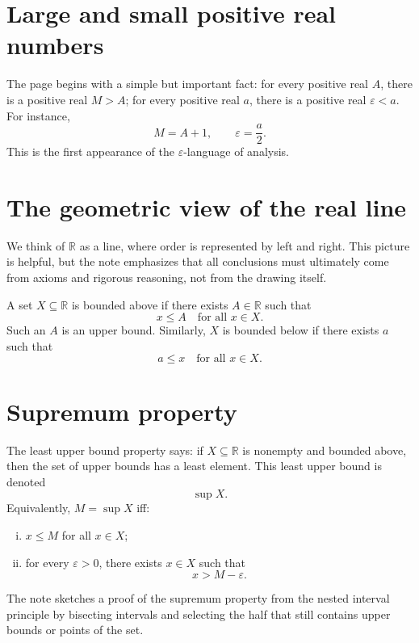 
\section{Large and small positive real numbers}

The page begins with a simple but important fact: for every positive real \(A\), there is a positive real \(M>A\); for every positive real \(a\), there is a positive real \(\varepsilon<a\).  For instance,
\[
  M=A+1,\qquad \varepsilon=\frac a2.
\]
This is the first appearance of the \(\varepsilon\)-language of analysis.

\section{The geometric view of the real line}

We think of \(\mathbb R\) as a line, where order is represented by left and right.  This picture is helpful, but the note emphasizes that all conclusions must ultimately come from axioms and rigorous reasoning, not from the drawing itself.

A set \(X\subseteq\mathbb R\) is bounded above if there exists \(A\in\mathbb R\) such that
\[
  x\le A\quad\text{for all }x\in X.
\]
Such an \(A\) is an upper bound.  Similarly, \(X\) is bounded below if there exists \(a\) such that
\[
  a\le x\quad\text{for all }x\in X.
\]

\section{Supremum property}

The least upper bound property says: if \(X\subseteq\mathbb R\) is nonempty and bounded above, then the set of upper bounds has a least element.  This least upper bound is denoted
\[
  \sup X.
\]
Equivalently, \(M=\sup X\) iff:
\begin{enumerate}[(i)]
  \item \(x\le M\) for all \(x\in X\);
  \item for every \(\varepsilon>0\), there exists \(x\in X\) such that
  \[
    x>M-\varepsilon.
  \]
\end{enumerate}
The note sketches a proof of the supremum property from the nested interval principle by bisecting intervals and selecting the half that still contains upper bounds or points of the set.

